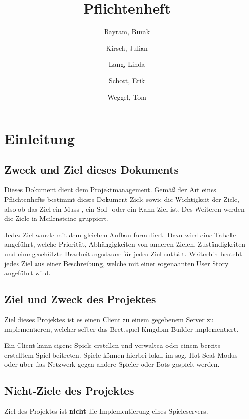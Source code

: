 \documentclass[a4paper]{scrreprt}
\begin{document}
\title{Pflichtenheft}
\author{
	Bayram, Burak
	\and
	Kirsch, Julian
	\and
	Lang, Linda
	\and
	Schott, Erik
	\and
	Weggel, Tom
}
\maketitle

\newpage

\tableofcontents
\newpage

\chapter{Einleitung}
\section{Zweck und Ziel dieses Dokuments}

Dieses Dokument dient dem Projektmanagement. Gemäß der Art eines Pflichtenhefts bestimmt dieses Dokument Ziele sowie die Wichtigkeit der Ziele, also ob das Ziel ein Muss-, ein Soll- oder ein Kann-Ziel ist. Des Weiteren werden die Ziele in Meilensteine gruppiert.

Jedes Ziel wurde mit dem gleichen Aufbau formuliert. Dazu wird eine Tabelle angeführt, welche Priorität, Abhängigkeiten von anderen Zielen, Zuständigkeiten und eine geschätzte Bearbeitungsdauer für jedes Ziel enthält.
Weiterhin besteht jedes Ziel aus einer Beschreibung, welche mit einer sogenannten User Story angeführt wird.


\section{Ziel und Zweck des Projektes}

Ziel dieses Projektes ist es einen Client zu einem gegebenem Server zu implementieren, welcher selber das Brettspiel \glqq Kingdom Builder\grqq{} implementiert.

Ein Client kann eigene Spiele erstellen und verwalten oder einem bereits erstelltem Spiel beitreten. Spiele können hierbei lokal im sog. \glqq Hot-Seat\grqq{}-Modus
oder über das Netzwerk gegen andere Spieler oder Bots gespielt werden.

\section{Nicht-Ziele des Projektes}

Ziel des Projektes ist \textbf{nicht} die Implementierung eines Spieleservers.
\end{document}
